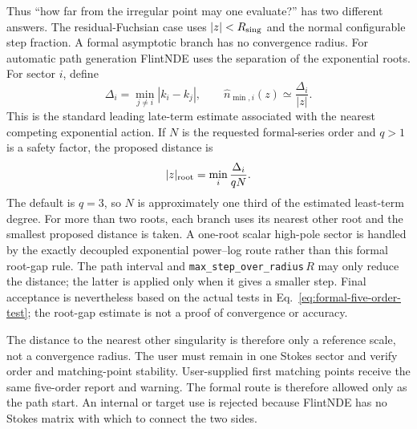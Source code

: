 \documentclass[11pt]{article}
\begin{document}
Thus ``how far from the irregular point may one evaluate?'' has two different answers.  The
residual-Fuchsian case uses $|z|<R_{\rm sing}$ and the normal configurable step fraction.  A
formal asymptotic branch has no convergence radius.  For automatic path generation FlintNDE
uses the separation of the exponential roots.  For sector $i$, define
\begin{equation}
 \Delta_i=\min_{j\ne i}|k_i-k_j|,
 \qquad
 \widehat n_{\min,i}(z)\simeq\frac{\Delta_i}{|z|}.
 \label{eq:formal-root-gap-estimate}
\end{equation}
This is the standard leading late-term estimate associated with the nearest competing
exponential action.  If $N$ is the requested formal-series order and $q>1$ is a safety factor,
the proposed distance is
\begin{equation}
 |z|_{\rm root}=\min_i\frac{\Delta_i}{qN}.
 \label{eq:formal-root-gap-point}
\end{equation}
The default is $q=3$, so $N$ is approximately one third of the estimated least-term degree.  For more
than two roots, each branch uses its nearest other root and the smallest proposed distance is
taken.  A one-root scalar high-pole sector is handled by the exactly decoupled exponential
power--log route rather than this formal root-gap rule.  The path interval and
\texttt{max\_step\_over\_radius}$\,R$ may only reduce the distance; the latter is applied only
when it gives a smaller step.  Final acceptance is nevertheless based on the actual tests in
Eq.~\eqref{eq:formal-five-order-test}; the root-gap estimate is not a proof of convergence or
accuracy.

The distance to the nearest other singularity is therefore only a reference scale, not a
convergence radius.  The user must remain in one Stokes sector and verify order and
matching-point stability.  User-supplied first matching points receive the same five-order
report and warning.  The
formal route is therefore allowed only as the path start.  An internal or target use is
rejected because FlintNDE has no Stokes matrix with which to connect the two sides.
\end{document}
